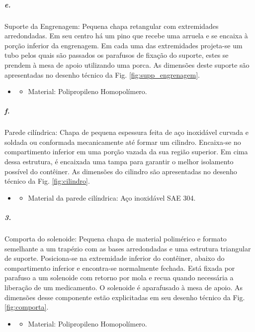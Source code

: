     \subparagraph*{e.} \label{retorno_suporte_engrenagem}
    Suporte da Engrenagem: Pequena chapa retangular com extremidades arredondadas. Em seu centro há um pino que recebe uma arruela e se encaixa à porção inferior da engrenagem. Em cada uma das extremidades projeta-se um tubo pelos quais são passados os parafusos de fixação do suporte, estes se prendem à mesa de apoio utilizando uma porca. As dimensões deste suporte são apresentadas no desenho técnico da Fig. \ref{fig:supp_engrenagem}.
    
    \begin{itemize}
   \item[]
   \begin{itemize}
       \item Material: Polipropileno Homopolímero.
   \end{itemize}
   \end{itemize}
     
   
    \subparagraph*{f.}\label{retorno_cilindro}
    Parede cilíndrica: Chapa de pequena espessura feita de aço inoxidável curvada e soldada ou conformada mecanicamente até formar um cilindro. Encaixa-se no compartimento inferior em uma porção vazada da sua região superior. Em cima dessa estrutura, é encaixada uma tampa para garantir o melhor isolamento possível do contêiner. As dimensões do cilindro são apresentadas no desenho técnico da Fig. \ref{fig:cilindro}.
    \begin{itemize}
   \item[]
   \begin{itemize}
       \item  Material da parede cilíndrica: Aço inoxidável SAE 304.
   \end{itemize}
   \end{itemize}
     
    
    \subparagraph*{3.} \label{retorno_comporta}
    Comporta do solenoide: Pequena chapa de material polimérico e formato semelhante a um trapézio com as bases arredondadas e uma estrutura triangular de suporte. Posiciona-se na extremidade inferior do contêiner, abaixo do compartimento inferior e encontra-se normalmente fechada. Está fixada por parafuso a um solenoide com retorno por mola e recua quando necessária a liberação de um medicamento. O solenoide é aparafusado à mesa de apoio. As dimensões desse componente estão explicitadas em seu desenho técnico da Fig. \ref{fig:comporta}.
    
     \begin{itemize}
   \item[]
   \begin{itemize}
       \item  Material: Polipropileno Homopolímero.
   \end{itemize}
   \end{itemize}
    
